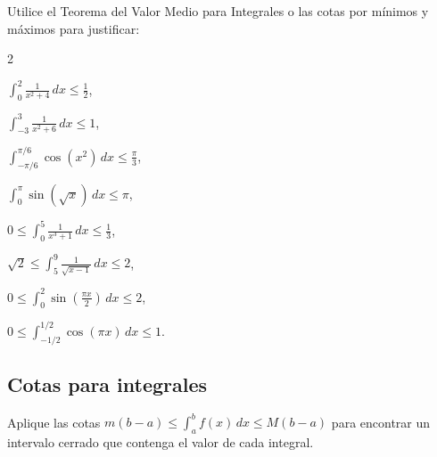 \documentclass[12pt]{article}
\begin{document}
Utilice el Teorema del Valor Medio para Integrales o las cotas por mínimos y
máximos para justificar:

\begin{enumerate}[resume]
\begin{multicols}{2}
\item $\int_0^2\frac{1}{x^2+4}\,dx\le\frac12$,
\item $\int_{-3}^3\frac{1}{x^2+6}\,dx\le1$,
\item $\int_{-\pi/6}^{\pi/6}\cos(x^2)\,dx\le\frac{\pi}{3}$,
\item $\int_0^\pi\sin(\sqrt{x})\,dx\le\pi$,
\item $0\le\int_0^5\frac{1}{x^3+1}\,dx\le\frac13$,
\item $\sqrt2\le\int_5^9\frac{1}{\sqrt{x-1}}\,dx\le2$,
\item $0\le\int_0^2\sin\left(\frac{\pi x}{2}\right)\,dx\le2$,
\item $0\le\int_{-1/2}^{1/2}\cos(\pi x)\,dx\le1$.
\end{multicols}
\end{enumerate}

\subsection{Cotas para integrales}
Aplique las cotas $m(b-a)\le\int_a^b f(x)\,dx\le M(b-a)$
para encontrar un intervalo cerrado que contenga el valor de cada integral.
\end{document}
